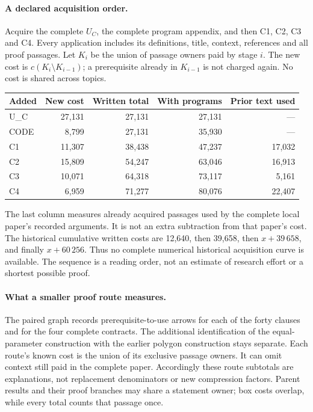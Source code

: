 \documentclass[a4paper,11pt]{article}
\begin{document}
\paragraph{A declared acquisition order.}
Acquire the complete $U_C$, the complete program appendix, and then C1,
C2, C3 and C4. Every application includes its definitions, title, context,
references and all proof passages. Let $K_i$ be the union of passage owners
paid by stage $i$. The new cost is $c(K_i\setminus K_{i-1})$; a prerequisite
already in $K_{i-1}$ is not charged again. No cost is shared across topics.
\begin{center}\begin{tabular}{lrrrr}\toprule
Added & New cost & Written total & With programs & Prior text used\\\midrule
U\_C & 27,131 & 27,131 & 27,131 & ---\\
CODE & 8,799 & 27,131 & 35,930 & ---\\
C1 & 11,307 & 38,438 & 47,237 & 17,032\\
C2 & 15,809 & 54,247 & 63,046 & 16,913\\
C3 & 10,071 & 64,318 & 73,117 & 5,161\\
C4 & 6,959 & 71,277 & 80,076 & 22,407\\
\bottomrule\end{tabular}\end{center}
The last column measures already acquired passages used by the complete local
paper's recorded arguments. It is not an extra subtraction from that paper's
cost. The historical cumulative written costs are 12,640, then 39,658,
then $x+39\,658$, and finally $x+60\,256$. Thus no complete numerical
historical acquisition curve is available. The sequence is a reading order,
not an estimate of research effort or a shortest possible proof.

\paragraph{What a smaller proof route measures.}
The paired graph records prerequisite-to-use arrows for each of the forty
clauses and for the four complete contracts. The additional identification of
the equal-parameter construction with the earlier polygon construction stays
separate. Each route's known cost is the union of its exclusive passage owners.
It can omit context still paid in the complete paper. Accordingly these route
subtotals are explanations, not replacement denominators or new compression
factors. Parent results and their proof branches may share a statement owner;
box costs overlap, while every total counts that passage once.
\end{document}
